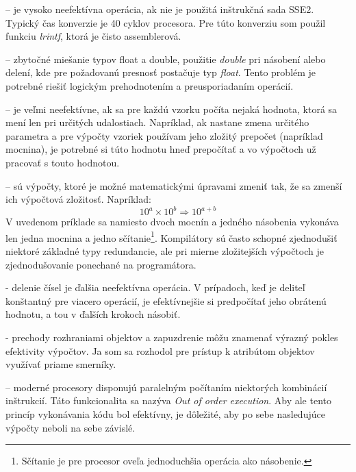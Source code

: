 \begin{description}
\setlength{\itemsep}{-0.5ex}
\item[Pretypovanie float na int] -- je vysoko neefektívna operácia, ak nie je použitá inštrukčná sada SSE2. Typický čas konverzie je 40 cyklov procesora. Pre túto konverziu som použil funkciu \emph{lrintf}, ktorá je čisto assemblerová.
\item[Neefektívne používanie typov] -- zbytočné miešanie typov float a double, použitie \emph{double} pri násobení alebo delení, kde pre požadovanú presnosť postačuje typ \emph{float}. Tento problém je potrebné riešiť logickým prehodnotením a preusporiadaním operácií.
\item[Viacnásobné rovnaké výpočty] -- je veľmi neefektívne, ak sa pre každú vzorku počíta nejaká hodnota, ktorá sa mení len pri určitých udalostiach. Napríklad, ak nastane zmena určitého parametra a pre výpočty vzoriek používam jeho zložitý prepočet (napríklad mocnina), je potrebné si túto hodnotu hneď prepočítať a vo výpočtoch už pracovať s touto hodnotou.
\item[Redundantné výpočty] -- sú výpočty, ktoré je možné matematickými úpravami zmeniť tak, že sa zmenší ich výpočtová zložitosť. Napríklad:
\begin{equation*}
10^a \times 10^b \Rightarrow 10^{a+b}
\end{equation*}
V uvedenom príklade sa namiesto dvoch mocnín a jedného násobenia vykonáva len jedna mocnina a jedno sčítanie\footnote{Sčítanie je pre procesor oveľa jednoduchšia operácia ako násobenie.}.
Kompilátory sú často schopné zjednodušiť niektoré základné typy redundancie, ale pri mierne zložitejších výpočtoch je zjednodušovanie ponechané na programátora.
\item[Delenie] - delenie čísel je ďalšia neefektívna operácia. V prípadoch, keď je deliteľ konštantný pre viacero operácií, je efektívnejšie si predpočítať jeho obrátenú hodnotu, a tou v ďalších krokoch násobiť.
\item[Príliš veľa rozhraní] - prechody rozhraniami objektov a zapuzdrenie môžu znamenať výrazný pokles efektivity výpočtov. Ja som sa rozhodol pre prístup k atribútom objektov využívať priame smerníky.
\item[Reťazenie závislosti za sebou nasledujúcich operácií] -- moderné procesory disponujú paralelným počítaním niektorých kombinácií inštrukcií. Táto funkcionalita sa nazýva \emph{Out of order execution}. Aby ale tento princíp vykonávania kódu bol efektívny, je dôležité, aby po sebe nasledujúce výpočty neboli na sebe závislé.

\end{description}
